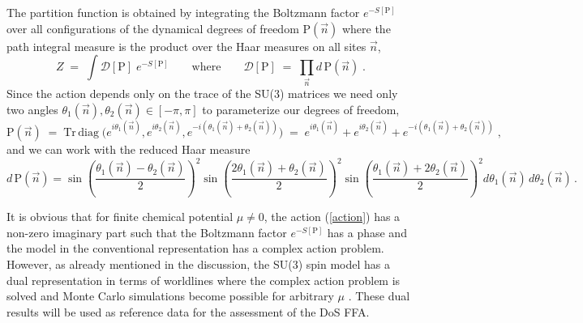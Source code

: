 \documentclass[a4paper,11pt]{article}
\begin{document}
The partition function is obtained by integrating the Boltzmann factor $e^{-S[\mathrm{P}]}$ over all configurations
of the dynamical degrees of freedom $\mathrm{P}(\vec{n})$ where the path integral measure is the product over the 
Haar measures on all sites $\vec{n}$,
%
\begin{equation}
Z  \; = \; \int \!\! \mathcal{D}[\mathrm{P}] \; e^{-S[\mathrm{P}]} \qquad 
\text{where} \qquad \mathcal{D}[\mathrm{P}] \; = \; \prod_{\vec{n}} d \, \mathrm{P}(\vec{n}) \;.
\end{equation}
%
Since the action depends only on the trace of the SU(3) matrices we need only  
two angles $\theta_1(\vec{n}), \theta_2(\vec{n}) \in [-\pi,\pi]$ to parameterize our degrees of freedom,
\begin{equation}
\mathrm{P}(\vec{n}) \; = \; \mathrm{Tr} \, \mathrm{diag} \; \Big( 
e^{i \theta_1(\vec{n})} , e^{i \theta_2(\vec{n})} ,  e^{-i(\theta_1(\vec{n})+\theta_2(\vec{n}))} \Big) \; = \; 
e^{i \theta_1(\vec{n})} + e^{i \theta_2(\vec{n})} + e^{-i(\theta_1(\vec{n})+\theta_2(\vec{n}))} \; ,
\end{equation}
and we can work with the reduced Haar measure 
\begin{equation}
d \, \mathrm{P}(\vec{n}) = \sin\! \left( \! \frac{\theta_1(\vec{n}) - \theta_2(\vec{n})}{2} \! \right)^{\!2} 
\sin\! \left( \! \frac{2 \theta_1(\vec{n}) + \theta_2(\vec{n})}{2} \! \right)^{\!2} 
\sin\! \left( \! \frac{\theta_1(\vec{n}) + 2 \theta_2(\vec{n})}{2} \! \right)^{\!2} d \theta_1(\vec{n}) \, d \theta_2(\vec{n}) \, .
\end{equation}

It is obvious that for finite chemical potential $\mu \neq 0$, the action (\ref{action}) 
has a non-zero imaginary part such that the Boltzmann factor $e^{-S[\mathrm{P}]}$ has a phase and the model 
in the conventional representation has a complex action problem. However, as already mentioned in the discussion, 
the SU(3) spin model has a dual representation in terms of worldlines \cite{Gattringer:2011gq} where the complex
action problem is solved and Monte Carlo simulations become possible for arbitrary 
$\mu$ \cite{Mercado:2012ue,Delgado:2012uh}. These
dual results will be used as reference data for the assessment of the DoS FFA.
\vskip5mm
\end{document}
